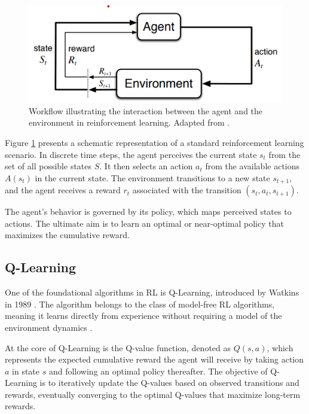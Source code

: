 \begin{figure}[ht]
    \centering
    \includegraphics[scale=1]{images/rl-workflow.png}
    \caption[Agent-Environment Interaction in Reinforcement Learning]{Workflow illustrating the interaction between the agent and the environment in reinforcement learning. Adapted from \cite{sutton2018reinforcement}.}
    \label{fig:sutton_rl_workflow}
\end{figure}

Figure \ref{fig:sutton_rl_workflow} presents a schematic representation of a standard reinforcement learning scenario. In discrete time steps, the agent perceives the current state $s_t$ from the set of all possible states $S$. It then selects an action $a_t$ from the available actions $A(s_t)$ in the current state. The environment transitions to a new state $s_{t+1}$, and the agent receives a reward $r_t$ associated with the transition $(s_t, a_t, s_{t+1})$.

The agent's behavior is governed by its policy, which maps perceived states to actions. The ultimate aim is to learn an optimal or near-optimal policy that maximizes the cumulative reward. 


\subsection{Q-Learning}

One of the foundational algorithms in RL is Q-Learning, introduced by Watkins in 1989 \cite{watkins1989learning}. The algorithm belongs to the class of model-free RL algorithms, meaning it learns directly from experience without requiring a model of the environment dynamics \cite{russel2020ai}.

At the core of Q-Learning is the Q-value function, denoted as $Q(s, a)$, which represents the expected cumulative reward the agent will receive by taking action $a$ in state $s$ and following an optimal policy thereafter. The objective of Q-Learning is to iteratively update the Q-values based on observed transitions and rewards, eventually converging to the optimal Q-values that maximize long-term rewards.

